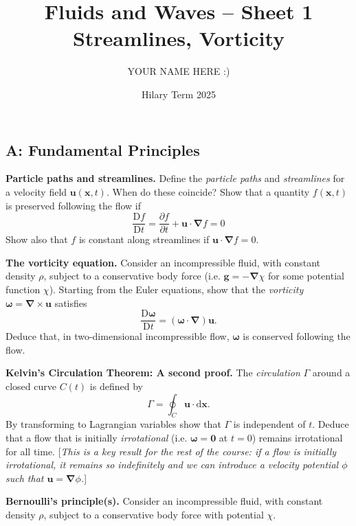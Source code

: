 \documentclass[answers]{exam}
\title{Fluids and Waves -- Sheet 1\\Streamlines, Vorticity}
\author{YOUR NAME HERE :)}
\date{Hilary Term 2025}
\begin{document}
\maketitle
\begin{questions}

\section*{A: Fundamental Principles}

\question%
\textbf{Particle paths and streamlines.} Define the \emph{particle paths} and \emph{streamlines} for a velocity field $\boldsymbol{u}(\boldsymbol{x}, t)$. When do these coincide? Show that a quantity $f(\boldsymbol{x}, t)$ is preserved following the flow if \[
	\frac{\mathrm{D} f}{\mathrm{D} t}=\frac{\partial f}{\partial t}+\boldsymbol{u} \cdot \boldsymbol{\nabla} f=0
\] Show also that $f$ is constant along streamlines if $\boldsymbol{u} \cdot \boldsymbol{\nabla} f=0$.



\question%
\textbf{The vorticity equation.} Consider an incompressible fluid, with constant density $\rho$, subject to a conservative body force (i.e. $\boldsymbol{g}=-\boldsymbol{\nabla} \chi$ for some potential function $\chi$). Starting from the Euler equations, show that the \emph{vorticity} $\boldsymbol{\omega}=\boldsymbol{\nabla} \times \boldsymbol{u}$ satisfies \[
	\frac{\mathrm{D} \boldsymbol{\omega}}{\mathrm{D} t}=(\boldsymbol{\omega} \cdot \boldsymbol{\nabla}) \boldsymbol{u}.
\] Deduce that, in two-dimensional incompressible flow, $\boldsymbol{\omega}$ is conserved following the flow.



\question%
\textbf{Kelvin's Circulation Theorem: A second proof.} The \emph{circulation} $\Gamma$ around a closed curve $C(t)$ is defined by \[
	\Gamma=\oint_{C} \boldsymbol{u} \cdot \mathrm{d} \boldsymbol{x} .
\] By transforming to Lagrangian variables show that $\Gamma$ is independent of $t$. Deduce that a flow that is initially \emph{irrotational} (i.e. $\boldsymbol{\omega}=\mathbf{0}$ at $t=0$) remains irrotational for all time. [\emph{This is a key result for the rest of the course: if a flow is initially irrotational, it remains so indefinitely and we can introduce a velocity potential $\phi$ such that $\mathbf{u}=\boldsymbol{\nabla} \phi$.}]



\question%
\textbf{Bernoulli's principle(s).} Consider an incompressible fluid, with constant density $\rho$, subject to a conservative body force with potential $\chi$.
\begin{parts}

\end{parts}
\end{questions}
\end{document}

